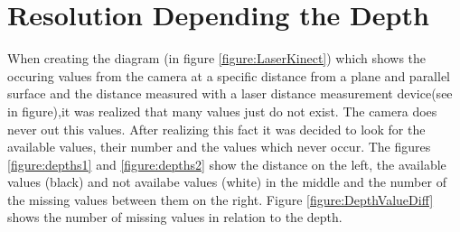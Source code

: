 \section{Resolution Depending the Depth} \label{resdepDepth}
When creating the diagram (in figure \vref{figure:LaserKinect}) which shows the occuring values from the camera 
at a specific distance from a plane and parallel surface and the distance measured with a laser distance measurement 
device(see in figure),it was realized that many values just do not exist. The camera does never out this values.
After realizing this fact it was decided to look for the available values, their number and the values which never occur.
The figures \vref{figure:depths1} and \vref{figure:depths2} show the distance on the left, the available values (black) and 
not availabe values (white) in the middle and the number of the missing values between them on the right. 
Figure \vref{figure:DepthValueDiff} shows the number of missing values in relation to the depth.

